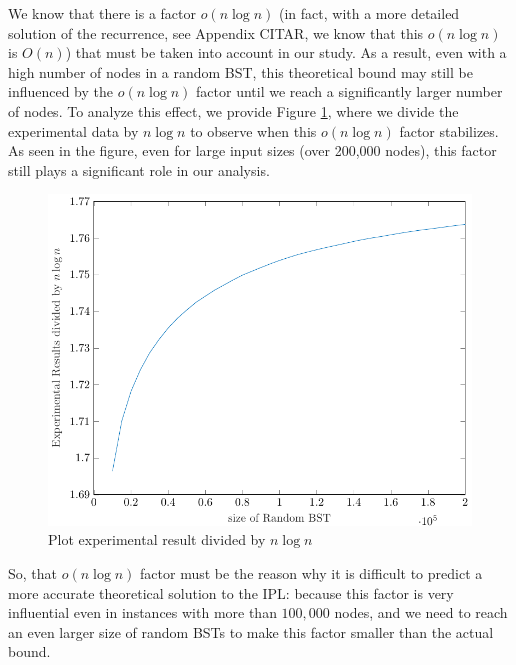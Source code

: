 We know that there is a factor \( o(n \log n) \) (in fact, with a more detailed solution of the recurrence, see Appendix CITAR, we know that this $o(n \log n)$ is $O(n)$) that must be taken into account in our study. As a result, even with a high number of nodes in a random BST, this theoretical bound may still be influenced by the \( o(n \log n) \) factor until we reach a significantly larger number of nodes. To analyze this effect, we provide Figure \ref{fig:plotBoundCtIPL}, where we divide the experimental data by \( n \log n \) to observe when this \( o(n \log n) \) factor stabilizes. As seen in the figure, even for large input sizes (over 200,000 nodes), this factor still plays a significant role in our analysis.

\begin{figure}[ht]
    \centering
    \includegraphics[scale=0.65]{plotCtIPL.pdf}
    \caption{Plot experimental result divided by $n \log n$}
    \label{fig:plotBoundCtIPL}
\end{figure}

So, that $o(n \log n)$ factor must be the reason why it is difficult to predict a more accurate theoretical solution to the IPL: because this factor is very influential even in instances with more than $100,000$ nodes, and we need to reach an even larger size of random BSTs to make this factor smaller than the actual bound.
